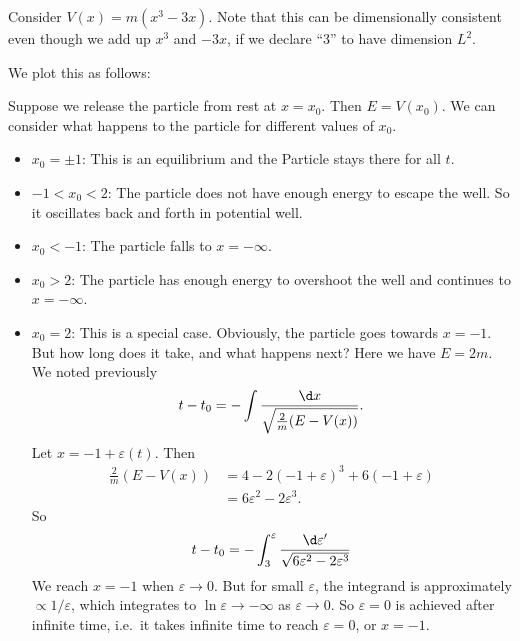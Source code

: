 \documentclass[a4paper]{article}
\begin{document}
\begin{eg}
  Consider $V(x) = m(x^3 - 3x)$. Note that this can be dimensionally consistent even though we add up $x^3$ and $-3x$, if we declare ``3'' to have dimension $L^2$.

  We plot this as follows:
  \begin{center}
  \end{center}
  Suppose we release the particle from rest at $x = x_0$. Then $E = V(x_0)$. We can consider what happens to the particle for different values of $x_0$.
  \begin{itemize}
    \item $x_0 = \pm 1$: This is an equilibrium and the Particle stays there for all $t$.
    \item $-1 < x_0 < 2$: The particle does not have enough energy to escape the well. So it oscillates back and forth in potential well.
    \item $x_0 < -1$: The particle falls to $x = -\infty$.
    \item $x_0 > 2$: The particle has enough energy to overshoot the well and continues to $x = -\infty$.
    \item $x_0 = 2$: This is a special case. Obviously, the particle goes towards $x = -1$. But how long does it take, and what happens next? Here we have $E = 2m$. We noted previously
      \[
        t - t_0 = -\int \frac{\d x}{\sqrt{\frac{2}{m}(E - V(x))}}.
      \]
      Let $x = -1 + \varepsilon(t)$. Then
      \begin{align*}
        \frac{2}{m}(E-V(x)) &= 4 - 2(-1 + \varepsilon)^3 + 6(-1 + \varepsilon)\\
        &= 6\varepsilon^2 - 2\varepsilon^3.
      \end{align*}
      So
      \[
        t - t_0 = -\int_3^\varepsilon \frac{\d \varepsilon'}{\sqrt{6\varepsilon^2 - 2\varepsilon^3}}
      \]
      We reach $x = -1$ when $\varepsilon \to 0$. But for small $\varepsilon$, the integrand is approximately $\propto 1/\varepsilon$, which integrates to $\ln \varepsilon \to -\infty$ as $\varepsilon \to 0$. So $\varepsilon = 0$ is achieved after infinite time, i.e.\ it takes infinite time to reach $\varepsilon = 0$, or $x = -1$.
  \end{itemize}
\end{eg}
\end{document}

